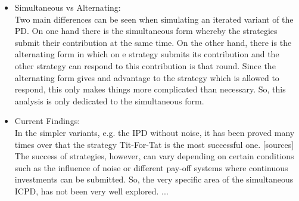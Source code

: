 \documentclass{article}
\begin{document}
\begin{itemize}

	\item Simultaneous vs Alternating:\\

Two main differences can be seen when simulating an iterated variant of the PD.
On one hand there is the simultaneous form whereby the strategies submit their contribution at the same time.
On the other hand, there is the alternating form in which on e strategy submits its contribution and the other strategy can respond to this contribution is that round.
Since the alternating form gives and advantage to the strategy which is allowed to respond, this only makes things more complicated than necessary.
So, this analysis is only dedicated to the simultaneous form.

	\item Current Findings:\\

In the simpler variants, e.g. the IPD without noise, it has been proved many times over that the strategy Tit-For-Tat is the most successful one. [sources]
The success of strategies, however, can vary depending on certain conditions such as the influence of noise or different pay-off systems where continuous investments can be submitted.
So, the very specific area of the simultaneous ICPD, has not been very well explored.
...


\end{itemize}
\end{document}
